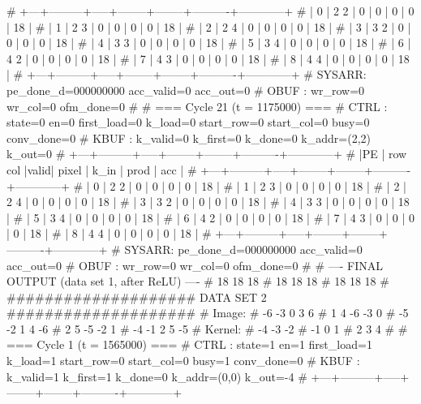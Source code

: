 # +---+---------+-----+--------+--------+----------+------------+
# | 0 |   2   2 |  0  |      0 |      0 |        0 |         18 |
# | 1 |   2   3 |  0  |      0 |      0 |        0 |         18 |
# | 2 |   2   4 |  0  |      0 |      0 |        0 |         18 |
# | 3 |   3   2 |  0  |      0 |      0 |        0 |         18 |
# | 4 |   3   3 |  0  |      0 |      0 |        0 |         18 |
# | 5 |   3   4 |  0  |      0 |      0 |        0 |         18 |
# | 6 |   4   2 |  0  |      0 |      0 |        0 |         18 |
# | 7 |   4   3 |  0  |      0 |      0 |        0 |         18 |
# | 8 |   4   4 |  0  |      0 |      0 |        0 |         18 |
# +---+---------+-----+--------+--------+----------+------------+
# SYSARR: pe_done_d=000000000 acc_valid=0 acc_out=0
# OBUF : wr_row=0 wr_col=0 ofm_done=0
# 
# === Cycle 21  (t = 1175000) ===
# CTRL : state=0 en=0 first_load=0 k_load=0 start_row=0 start_col=0 busy=0 conv_done=0
# KBUF : k_valid=0 k_first=0 k_done=0 k_addr=(2,2) k_out=0
# +---+---------+-----+--------+--------+----------+------------+
# |PE | row col |valid| pixel  |  k_in  |   prod   |    acc     |
# +---+---------+-----+--------+--------+----------+------------+
# | 0 |   2   2 |  0  |      0 |      0 |        0 |         18 |
# | 1 |   2   3 |  0  |      0 |      0 |        0 |         18 |
# | 2 |   2   4 |  0  |      0 |      0 |        0 |         18 |
# | 3 |   3   2 |  0  |      0 |      0 |        0 |         18 |
# | 4 |   3   3 |  0  |      0 |      0 |        0 |         18 |
# | 5 |   3   4 |  0  |      0 |      0 |        0 |         18 |
# | 6 |   4   2 |  0  |      0 |      0 |        0 |         18 |
# | 7 |   4   3 |  0  |      0 |      0 |        0 |         18 |
# | 8 |   4   4 |  0  |      0 |      0 |        0 |         18 |
# +---+---------+-----+--------+--------+----------+------------+
# SYSARR: pe_done_d=000000000 acc_valid=0 acc_out=0
# OBUF : wr_row=0 wr_col=0 ofm_done=0
# 
# ---- FINAL OUTPUT (data set 1, after ReLU) ----
#           18         18         18
#           18         18         18
#           18         18         18
# 
#################### DATA SET 2 ####################
# Image:
#     -6   -3    0    3    6
#      1    4   -6   -3    0
#     -5   -2    1    4   -6
#      2    5   -5   -2    1
#     -4   -1    2    5   -5
# Kernel:
#     -4   -3   -2
#     -1    0    1
#      2    3    4
# 
# === Cycle 1  (t = 1565000) ===
# CTRL : state=1 en=1 first_load=1 k_load=1 start_row=0 start_col=0 busy=1 conv_done=0
# KBUF : k_valid=1 k_first=1 k_done=0 k_addr=(0,0) k_out=-4
# +---+---------+-----+--------+--------+----------+------------+
